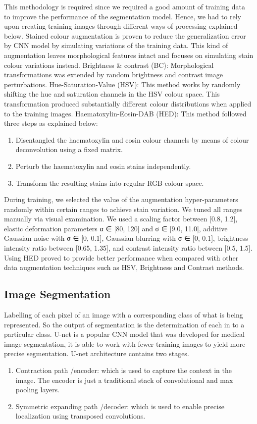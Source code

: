 \documentclass{article}
\begin{document}
	This methodology is required since we required a good amount of training data to improve the performance of the segmentation model. Hence, we had to rely upon creating training images through different ways of processing explained below. Stained colour augmentation is proven to reduce the generalization error by CNN model by simulating variations of the training data. This kind of augmentation leaves morphological features intact and focuses on simulating stain colour variations instead. 
Brightness & contrast (BC): Morphological transformations was extended by random brightness and contrast image perturbations.
Hue-Saturation-Value (HSV): This method works by randomly shifting the hue and saturation channels in the HSV colour space. This transformation produced substantially different colour distributions when applied to the training images. 
Haematoxylin-Eosin-DAB (HED): This method followed three steps as explained below:
\begin{enumerate}
\item Disentangled the haematoxylin and eosin colour channels by means of colour deconvolution using a fixed matrix. 
\item Perturb the haematoxylin and eosin stains independently. 
\item Transform the resulting stains into regular RGB colour space.
\end{enumerate}
During training, we selected the value of the augmentation hyper-parameters randomly within certain ranges to achieve stain variation. We tuned all ranges manually via visual examination. We used a scaling factor between [0.8, 1.2], elastic deformation parameters α ∈ [80, 120] and σ ∈ [9.0, 11.0], additive Gaussian noise with σ ∈ [0, 0.1], Gaussian blurring with σ ∈ [0, 0.1], brightness intensity ratio between [0.65, 1.35], and contrast intensity ratio between [0.5, 1.5].
Using HED proved to provide better performance when compared with other data augmentation techniques such as HSV, Brightness and Contrast methods. 

\subsection{Image Segmentation}

	Labelling of each pixel of an image with a corresponding class of what is being represented. So the output of segmentation is the determination of each in to a particular class. U-net is a popular CNN model that was developed for medical image segmentation, it is able to work with fewer training images to yield more precise segmentation. 
U-net architecture contains two stages. 
\begin{enumerate}
\item Contraction path /encoder: which is used to capture the context in the image. The encoder is just a traditional stack of convolutional and max pooling layers. 
\item Symmetric expanding path /decoder: which is used to enable precise localization using transposed convolutions. 
\end{enumerate}
\end{document}
